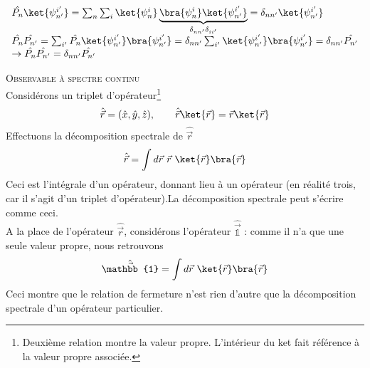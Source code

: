 \begin{equation}
\begin{array}{ll}
\hat{P_n}\ket{\psi^{i'}_{n'}} = \sum_n \sum_i \ket{\psi^i_{n}}
 \underbrace{\bra{\psi^i_{n}}\ket{\psi^{i'}_{n'}}}_{\delta_{n n'} \delta_{i i'}} 
= \delta_{n n'} \ket{\psi^{i'}_{n'}}\\
\hat{P_n}\hat{P_{n'}} = \sum_{i'} \hat{P_n} \ket{\psi^{i'}_{n'}}\bra{\psi^{i'}_{n'}}
 = \delta_{n n'} \sum_{i'}\ket{\psi^{i'}_{n'}}\bra{\psi^{i'}_{n'}}
 = \delta_{n n'}\hat{P_{n'}}\\
\rightarrow \hat{P_n}\hat{P_{n'}} = \delta_{n n'}\hat{P_{n'}}
\end{array}
\end{equation}




\textsc{Observable à spectre continu}\\
Considérons un triplet d'opérateur\footnote{Deuxième relation montre la valeur 
propre. L'intérieur du ket fait référence à la valeur propre associée.}
\begin{equation}
\hat{\vec{r}} = (\hat{x},\hat{y},\hat{z}),\qquad \hat{\vec{r}}\ket{\vec{r}} = 
\vec{r}\ket{\vec{r}}
\end{equation}
Effectuons la décomposition spectrale de $\hat{\vec{r}}$
\begin{equation}
\hat{\vec{r}} = \int d\vec{r}\ \vec{r}\ \ket{\vec{r}}\bra{\vec{r}}
\end{equation}
Ceci est l'intégrale d'un opérateur, donnant lieu à un opérateur (en réalité 
trois, car il s'agit d'un triplet d'opérateur).La décomposition spectrale peut 
s'écrire comme ceci. \\
A la place de l'opérateur $\hat{\vec r}$, considérons l'opérateur $\hat{\vec{\mathbb{1}}}$
 : comme il n'a que une seule valeur propre, nous retrouvons
\begin{equation}
\hat{\vec{\mathbb{1}}} = \int d\vec{r}\ \ket{\vec{r}}\bra{\vec{r}}
\end{equation}
Ceci montre que le relation de fermeture n'est rien d'autre que la 
décomposition spectrale d'un opérateur particulier.\\

